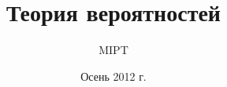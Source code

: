 




\title{Теория вероятностей}
\author{MIPT}
\date{Осень 2012 г.}
\maketitle
\tableofcontents

\pagebreak


















